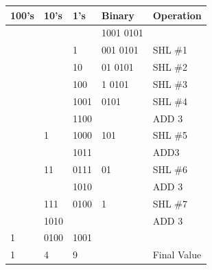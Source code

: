 \documentclass{rapportECL}
\begin{document}
\begin{table}[H]
\centering
{} \label{tab:title2} 

\begin{tabular}{|l|l|l|l|l|}
\hline
100's                    & 10's                        & 1's                         & Binary                  & Operation               \\ \hline
                         &                             &                             & 1001 0101               &                         \\ \hline
                         &                             & 1                           & 001  0101               & SHL \#1                 \\ \hline
                         &                             & 10                          & 01 0101                 & SHL \#2                 \\ \hline
                         &                             & 100                         & 1 0101                  & SHL \#3                 \\ \hline
                         &                             & 1001                        & 0101                    & SHL \#4                 \\ \hline
                         &                             & 1100                        &                         & ADD 3                   \\ \hline
                         & 1                           & 1000                        & 101                     & SHL \#5                 \\ \hline
                         &                             & 1011                        &                         & ADD3                    \\ \hline
                         & 11                          & 0111                        & 01                      & SHL \#6                 \\ \hline
                         &                             & 1010                        &                         & ADD 3                   \\ \hline
                         & 111                         & 0100                        & 1                       & SHL \#7                 \\ \hline
                         & 1010                        &                             &                         & ADD 3                   \\ \hline
{1} & { 0100} & {1001} & & \\ \hline\hline
1                        & 4                           & 9                           &                         & Final Value             \\ \hline
\end{tabular}
\end{table}
\end{document}
